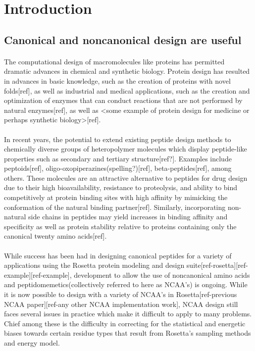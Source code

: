 \section{Introduction}
\subsection{Canonical and noncanonical design are useful}
\paragraph{}
The computational design of macromolecules like proteins has permitted dramatic advances in chemical and synthetic biology.
Protein design has resulted in advances in basic knowledge, such as the creation of proteins with novel folds[ref], as well as industrial and medical applications, such as the creation and optimization of enzymes that can conduct reactions that are not performed by natural enzymes[ref], as well as <some example of protein design for medicine or perhaps synthetic biology>[ref].

\paragraph{}
In recent years, the potential to extend existing peptide design methods to chemically diverse groups of heteropolymer molecules which display peptide-like properties such as secondary and tertiary structure[ref?].
Examples include peptoids[ref], oligo-oxopiperazines(spelling?)[ref], beta-peptides[ref], among others.
These molecules are an attractive alternative to peptides for drug design due to their high bioavailability, resistance to proteolysis, and ability to bind competitively at protein binding sites with high affinity by mimicking the conformation of the natural binding partner[ref].
Similarly, incorporating non-natural side chains in peptides may yield increases in binding affinity and specificity as well as protein stability relative to proteins containing only the canonical twenty amino acids[ref].

\paragraph{}
While success has been had in designing canonical peptides for a variety of applications using the Rosetta protein modeling and design suite[ref-rosetta][ref-example][ref-example], development to allow the use of noncanonical amino acids and peptidomemetics(collectively referred to here as NCAA's) is ongoing.
While it is now possible to design with a variety of NCAA's in Rosetta[ref-previous NCAA paper][ref-any other NCAA implementation work], NCAA design still faces several issues in practice which make it difficult to apply to many problems.
Chief among these is the difficulty in correcting for the statistical and energetic biases towards certain residue types that result from Rosetta's sampling methods and energy model.

